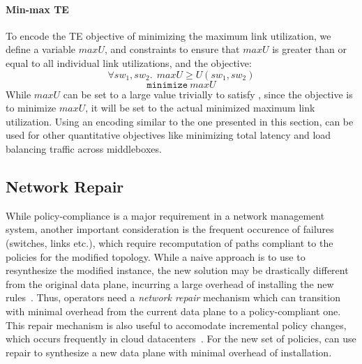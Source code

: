 \paragraph{Min-max TE}
To encode the TE objective of minimizing the maximum link utilization, we define
a variable $maxU$, and constraints to ensure that $maxU$ is greater than or equal to all 
individual link utilizations, and the objective: 
\begin{equation} \label{eq:maxu}
\forall sw_1, sw_2.\ \ maxU \geq U(sw_1, sw_2)
\end{equation} 
\begin{equation}
		\texttt{minimize}\ maxU
\end{equation}
While $maxU$ can be set to a large value trivially to satisfy , 
since the objective is to minimize $maxU$, it will be set to the actual
minimized maximum link utilization. Using an encoding similar to the one presented in this section, \name can be used for other
quantitative objectives like minimizing total latency and load balancing
traffic across middleboxes.

\subsection{Network Repair}
While policy-compliance is a major requirement in a network management system,
another important consideration is the frequent occurence of failures (switches, links etc.),
which require recomputation of paths compliant to the policies for the modified topology. 
While a naive approach is to use \name to resynthesize the modified instance,
the new solution may be drastically different from the original data plane, incurring a
large overhead of installing the new rules~\cite{sdnlatency,updatescheduling}. Thus, operators
need a \emph{network repair} mechanism which can transition with minimal
overhead from the current
data plane to a policy-compliant one. 
This repair mechanism is also useful to accomodate incremental policy
changes, which occurs frequently in cloud datacenters~\cite{mpa-imc15}. 
For the new set of policies, \name can use repair to synthesize
a new data plane with minimal overhead of installation.  

